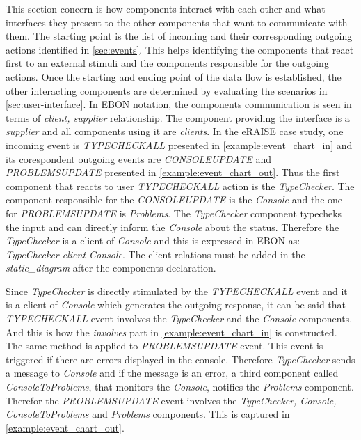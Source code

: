 \documentclass[conference]{IEEEtran}
\newcommand{\note}[1]{\todo[inline,color=red!40]{#1}}
\begin{document}
This section concern is how components interact with each other and
what interfaces they present to the other components that want to
communicate with them. The starting point is the list of incoming and
their corresponding outgoing actions identified in
\autoref{sec:events}. This helps identifying the components that react
first to an external stimuli and the components responsible for the
outgoing actions. Once the starting and ending point of the data flow
is established, the other interacting components are determined by
evaluating the scenarios in \autoref{sec:user-interface}. In EBON
notation, the components communication is seen in terms of
\emph{client, supplier} relationship. The component providing the
interface is a \emph{supplier} and all components using it are
\emph{clients}. In the eRAISE case study, one incoming event is
\emph{TYPECHECKALL} presented in \autoref{example:event_chart_in} and
its corespondent outgoing events are \emph{CONSOLEUPDATE} and
\emph{PROBLEMSUPDATE} presented in \autoref{example:event_chart_out}.
Thus the first component that reacts to user \emph{TYPECHECKALL}
action is the \emph{TypeChecker}. The component responsible for the
\emph{CONSOLEUPDATE} is the \emph{Console} and the one for
\emph{PROBLEMSUPDATE} is \emph{Problems}. The \emph{TypeChecker}
component typecheks the input and can directly inform the
\emph{Console} about the status. Therefore the \emph{TypeChecker} is a
client of \emph{Console} and this is expressed in EBON as: \emph{
TypeChecker client Console}. The client relations must be added in the
\emph{static\_diagram} after the components declaration.


Since \emph{TypeChecker} is directly stimulated by the
\emph{TYPECHECKALL} event and it is a client of \emph{Console} which
generates the outgoing response, it can be said that\emph{
TYPECHECKALL} event involves the \emph{TypeChecker} and the
\emph{Console} components. And this is how the \emph{involves} part in
\autoref{example:event_chart_in} is constructed. The same method is
applied to \emph{PROBLEMSUPDATE} event. This event is triggered if
there are errors displayed in the console. Therefore
\emph{TypeChecker} sends a message to \emph{Console} and if the
message is an error, a third component called \emph{ConsoleToProblems},
that monitors the \emph{Console}, notifies the \emph{Problems}
component. Therefor the \emph{PROBLEMSUPDATE} event involves the
\emph{TypeChecker, Console, ConsoleToProblems} and \emph{Problems}
components. This is captured in \autoref{example:event_chart_out}.
\end{document}
